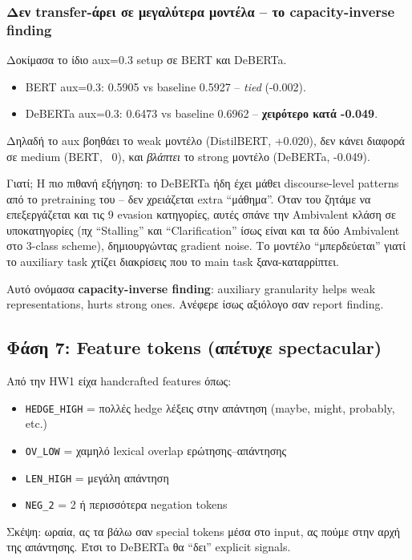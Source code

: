 \documentclass[12pt]{fphw}
\begin{document}
\subsubsection{Δεν transfer-άρει σε μεγαλύτερα μοντέλα -- το capacity-inverse finding}

Δοκίμασα το ίδιο aux=0.3 setup σε BERT και DeBERTa.

\begin{itemize}
    \item BERT aux=0.3: 0.5905 vs baseline 0.5927 -- \emph{tied} (-0.002).
    \item DeBERTa aux=0.3: 0.6473 vs baseline 0.6962 -- \textbf{χειρότερο κατά -0.049}.
\end{itemize}

Δηλαδή το aux βοηθάει το weak μοντέλο (DistilBERT, +0.020), δεν κάνει διαφορά σε medium (BERT, ~0), και \emph{βλάπτει} το strong μοντέλο (DeBERTa, -0.049).

Γιατί; Η πιο πιθανή εξήγηση: το DeBERTa ήδη έχει μάθει discourse-level patterns από το pretraining του -- δεν χρειάζεται extra ``μάθημα''. Όταν του ζητάμε να επεξεργάζεται και τις 9 evasion κατηγορίες, αυτές σπάνε την Ambivalent κλάση σε υποκατηγορίες (πχ ``Stalling'' και ``Clarification'' ίσως είναι και τα δύο Ambivalent στο 3-class scheme), δημιουργώντας gradient noise. Το μοντέλο ``μπερδεύεται'' γιατί το auxiliary task χτίζει διακρίσεις που το main task ξανα-καταρρίπτει.

Αυτό ονόμασα \textbf{capacity-inverse finding}: auxiliary granularity helps weak representations, hurts strong ones. Ανέφερε ίσως αξιόλογο σαν report finding.

\subsection{Φάση 7: Feature tokens (απέτυχε spectacular)}

Από την HW1 είχα handcrafted features όπως:
\begin{itemize}
    \item \texttt{HEDGE\_HIGH} = πολλές hedge λέξεις στην απάντηση (maybe, might, probably, etc.)
    \item \texttt{OV\_LOW} = χαμηλό lexical overlap ερώτησης--απάντησης
    \item \texttt{LEN\_HIGH} = μεγάλη απάντηση
    \item \texttt{NEG\_2} = 2 ή περισσότερα negation tokens
\end{itemize}

Σκέψη: ωραία, ας τα βάλω σαν special tokens μέσα στο input, ας πούμε στην αρχή της απάντησης. Έτσι το DeBERTa θα ``δει'' explicit signals.
\end{document}
